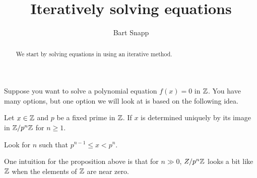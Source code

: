 \documentclass{ximera}
\author{Bart Snapp}
\title{Iteratively solving equations}
\begin{document}
\begin{abstract}
  We start by solving equations in using an iterative method.
\end{abstract}
\maketitle


Suppose you want to solve a polynomial equation $f(x)=0$ in $\mathbb Z$. You
have many options, but one option we will look at is based on the
following idea.


\begin{proposition}
  Let $x\in\mathbb Z$ and $p$ be a fixed prime in $\mathbb Z$. If $x$ is determined
  uniquely by its image in $\mathbb Z/p^n\mathbb Z$ for $n\ge 1$.
  \begin{sketch}
    Look for $n$ such that $p^{n-1}\le x < p^n$.
  \end{sketch}
\end{proposition}

One intuition for the proposition above is that for $n\gg 0$,
$Z/p^n\mathbb Z$ looks a bit like $\mathbb Z$ when the elements of $\mathbb Z$ are near
zero.
\end{document}
